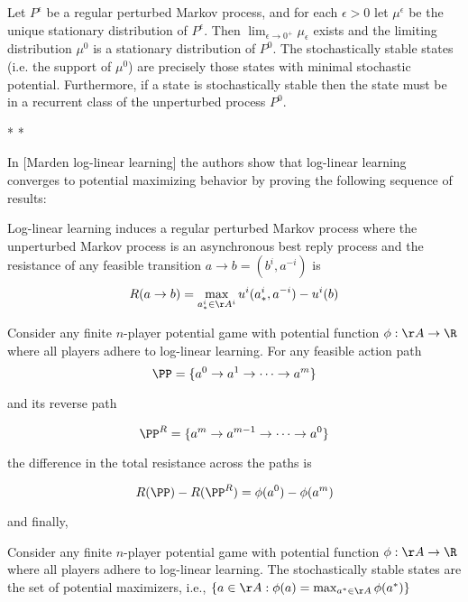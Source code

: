 \begin{thm}
Let $P^{\epsilon}$ be a regular perturbed Markov process, and for each $\epsilon > 0$ let $\mu^{\epsilon}$ be the unique stationary distribution of $P^{\epsilon}$. Then $\lim_{\epsilon \rightarrow 0^+} \mu_{\epsilon}$ exists and the limiting distribution $\mu^0$ is a stationary distribution of $P^0$. The stochastically stable states (i.e. the support of $\mu^0$) are precisely those states with minimal stochastic potential. Furthermore, if a state is stochastically stable then the state must be in a recurrent class of the unperturbed process $P^0$.
\end{thm}
 
*
*

In [Marden log-linear learning] the authors show that log-linear learning converges to potential maximizing behavior by proving the following sequence of results:

\begin{lem}[Marden 3.1]
Log-linear learning induces a regular perturbed Markov process where the unperturbed Markov process is an asynchronous best reply process and the resistance of any feasible transition $a \rightarrow b = (b^i, a^{-i})$ is
$$
R(a \rightarrow b) = \max_{a^i_* \in \AA^i} u^i(a^i_*, a^{-i}) - u^i(b)
$$
\end{lem}


\begin{lem}[Marden 3.2]
Consider any finite $n$-player potential game with potential function $\phi: \AA \rightarrow \R$ where all players adhere to log-linear learning. For any feasible action path
$$
\PP = \{a^0 \rightarrow a^1 \rightarrow \cdots \rightarrow a^m\}
$$

and its reverse path

$$
\PP^R = \{a^m \rightarrow a^{m-1} \rightarrow \cdots \rightarrow a^0\}
$$

the difference in the total resistance across the paths is

$$
R(\PP) - R(\PP^R) = \phi(a^0) - \phi(a^m)
$$
\end{lem}

and finally,

\begin{prop}[3.1 Marden]
Consider any finite $n$-player potential game with potential function $\phi: \AA \rightarrow \R$ where all players adhere to log-linear learning. The stochastically stable states are the set of potential maximizers, i.e., $\{ a \in \AA : \phi(a) = \max_{a^* \in \AA} \phi(a^*)  \}$
\end{prop}



